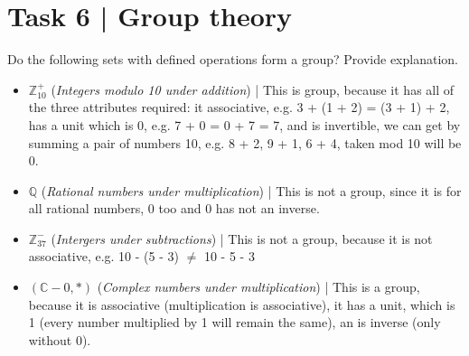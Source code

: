 \documentclass{article}
\begin{document}
\section*{Task 6 | Group theory}
Do the following sets with defined operations form a group? Provide explanation.
\begin{itemize}
    \item $\mathbb{Z}_{10}^+$ (\textit{Integers modulo 10 under addition}) | 
        This is group, because it has all of the three attributes required: it associative, 
        e.g. 3 + (1 + 2) = (3 + 1) + 2, has a unit which is 0, e.g. 7 + 0 = 0 + 7 = 7, and
        is invertible, we can get by summing a pair of numbers 10, e.g. 8 + 2, 9 + 1, 6 + 4,
        taken mod 10 will be 0.
    \item $\mathbb{Q}$ (\textit{Rational numbers under multiplication}) | This is not a group, 
        since it is for all rational numbers, 0 too and 0 has not an inverse.
    \item $\mathbb{Z}_{37}^-$ (\textit{Intergers under subtractions}) | This is not a group, because
        it is not associative, e.g. 10 - (5 - 3) $\ne$ 10 - 5 - 3
    \item $(\mathbb{C} - 0, *)$ (\textit{Complex numbers under multiplication}) | This is a group, 
        because it is associative (multiplication is associative), it has a unit, 
        which is 1 (every number multiplied by 1 will remain the same), an is inverse (only without 0).
\end{itemize}
\end{document}
